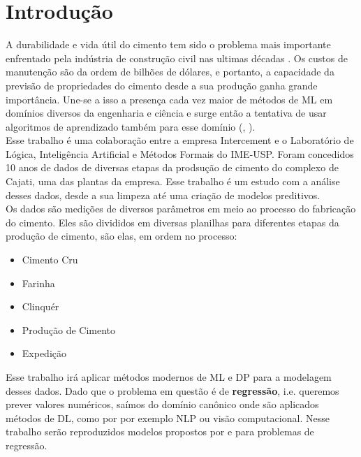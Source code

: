 \chapter{Introdução}
\label{cap:introducao}


A durabilidade e vida útil do cimento tem sido o problema mais importante enfrentado pela indústria de construção civil nas ultimas décadas \citep{cementml}. Os custos de manutenção são da ordem de bilhões de dólares, e portanto, a capacidade da previsão de propriedades do cimento desde a sua produção ganha grande importância. Une-se a isso a presença cada vez maior de métodos de ML em domínios diversos da engenharia e ciência e surge então a tentativa de usar algoritmos de aprendizado também para esse domínio (\cite{cementnn1}, \cite{cementnn2}). \\ 

Esse trabalho é uma colaboração entre a empresa Intercement e o Laboratório de Lógica, Inteligência Artificial e Métodos Formais do IME-USP. Foram concedidos 10 anos de dados de diversas etapas da prodsução de cimento do complexo de Cajati, uma das plantas da empresa. Esse trabalho é um estudo com a análise desses dados, desde a sua limpeza até uma criação de modelos preditivos. \\


Os dados são medições de diversos parâmetros em meio ao processo do fabricação do cimento. Eles são divididos em diversas planilhas para diferentes etapas da produção de cimento, são elas, em ordem no processo:

\begin{itemize}
        \item Cimento Cru
        \item Farinha
        \item Clinquér
        \item Produção de Cimento
        \item Expedição
\end{itemize}


Esse trabalho irá aplicar métodos modernos de ML e DP para a modelagem desses dados. Dado que o problema em questão é de \textbf{regressão}, i.e. queremos prever valores numéricos, saímos do domínio canônico onde são aplicados métodos de DL, como por por exemplo NLP ou visão computacional. Nesse trabalho serão reproduzidos modelos propostos por \citet{ubertime} e \citet{energylstm} para problemas de regressão.



